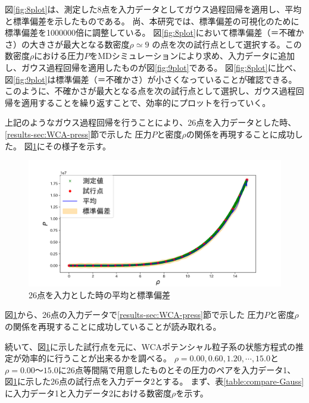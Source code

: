 \documentclass[titlepage]{jsreport}
\begin{document}
{{{\newpage
図\ref{fig:8plot}は、測定した8点を入力データとしてガウス過程回帰を適用し、平均と標準偏差を示したものである。
尚、本研究では、標準偏差の可視化のために標準偏差を1000000倍に調整している。
図\ref{fig:8plot}において標準偏差（＝不確かさ）の大きさが最大となる数密度${\rho}\simeq9$
の点を次の試行点として選択する。この数密度$\rho$における圧力$P$をMDシミュレーションにより求め、入力データに追加し、ガウス過程回帰を適用したものが図\ref{fig:9plot}である。
図\ref{fig:8plot}に比べ、図\ref{fig:9plot}は標準偏差（＝不確かさ）が小さくなっていることが確認できる。
このように、不確かさが最大となる点を次の試行点として選択し、ガウス過程回帰を適用することを繰り返すことで、効率的にプロットを行っていく。

上記のようなガウス過程回帰を行うことにより、26点を入力データとした時、\ref{results-sec:WCA-press}節で示した
圧力$P$と密度$\rho$の関係を再現することに成功した。
図\ref{fig:26plot}にその様子を示す。

\begin{figure}[htbp]
    \begin{center}
        \includegraphics[width=14cm]{fig/26plot-Gauss.png}
    \end{center}
    \caption{26点を入力とした時の平均と標準偏差}
    \label{fig:26plot}
\end{figure}

図\ref{fig:26plot}から、26点の入力データで\ref{results-sec:WCA-press}節で示した
圧力$P$と密度$\rho$の関係を再現することに成功していることが読み取れる。

続いて、図\ref{fig:26plot}に示した試行点を元に、WCAポテンシャル粒子系の状態方程式の推定が効率的に行うことが出来るかを調べる。
$\rho=0.00,0.60,1.20,\cdots,15.0$と$\rho=0.00〜15.0$に26点等間隔で用意したものとその圧力のペアを入力データ1、
図\ref{fig:26plot}に示した26点の試行点を入力データ2とする。
まず、表\ref{table:compare-Gauss}に入力データ1と入力データ2における数密度$\rho$を示す。

}}}
\end{document}
